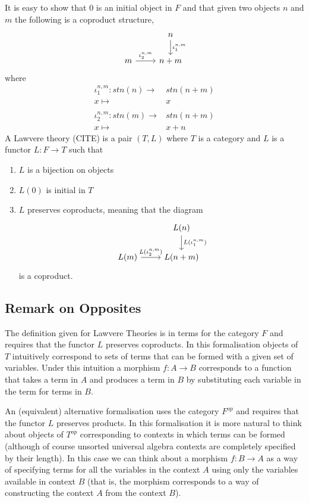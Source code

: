It is easy to show that $0$ is an initial object in $F$ and that given two
objects $n$ and $m$ the following is a coproduct structure,
\[
\begin{tikzcd}
    & n\arrow[d, "\iota_1^{n,m}"] \\
    m\arrow[r, "\iota_2^{n,m}"] & n+m
\end{tikzcd}
\]
where
\begin{align*}
    \iota_1^{n,m}:stn(n)\to& stn(n+m) \\
    x\mapsto&x \\
    \\
    \iota_2^{n,m}:stn(m)\to& stn(n+m) \\
    x\mapsto&x+n
\end{align*}
A Lawvere theory (CITE) is a pair $(T, L)$ where $T$ is a category and $L$ is a
functor $L : F \to T$ such that
\begin{enumerate}
    \item $L$ is a bijection on objects
    \item $L(0)$ is initial in $T$
    \item $L$ preserves coproducts, meaning that the diagram
    \[
    \begin{tikzcd}
        & L(n)\arrow[d, "L(\iota_1^{n,m})"] \\
        L(m)\arrow[r, "L(\iota_2^{n,m})"] & L(n+m)
    \end{tikzcd}
    \]
    is a coproduct.
\end{enumerate}

\subsection{Remark on Opposites}
The definition given for Lawvere Theories is in terms for the category $F$ and
requires that the functor $L$ preserves coproducts. In this formalisation
objects of $T$ intuitively correspond to sets of terms that can be formed with a
given set of variables. Under this intuition a morphism $f:A\to B$ corresponds
to a function that takes a term in $A$ and produces a term in $B$ by
substituting each variable in the term for terms in $B$.

An (equivalent) alternative formalisation uses the category $F^{op}$ and
requires that the functor $L$ preserves products. In this formalisation it
is more natural to think about objects of $T^{op}$ corresponding to contexts in
which terms can be formed (although of course unsorted universal algebra
contexts are completely specified by their length). In this case we can think
about a morphism $f:B\to A$ as a way of specifying terms for all the variables
in the context $A$ using only the variables available in context $B$ (that is,
the morphism corresponds to a way of constructing the context $A$ from the
context $B$). 

